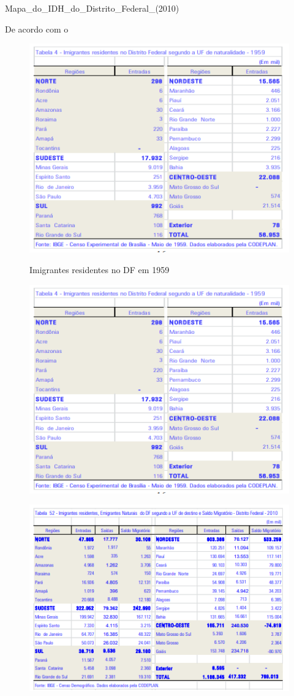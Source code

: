 {Mapa_do_IDH_do_Distrito_Federal_(2010)}



De acordo com o 

\begin{figure}[h]
    \centering
    \includegraphics[width=0.7\linewidth]{fig/imigrantes-1959}
    \label{fig:imigrantes-1959}
    \caption{Imigrantes residentes no DF em 1959}
\end{figure}

\lipsum[1-30]

\begin{figure}[h]
    \centering
    \includegraphics[width=0.7\linewidth]{fig/imigrantes-1959}
    \caption{}
\end{figure}

\begin{figure}[h]
    \centering
    \includegraphics[width=0.7\linewidth]{fig/imigrantes-2010}
    \caption{}
    \label{fig:imigrantes-2010}
\end{figure}
